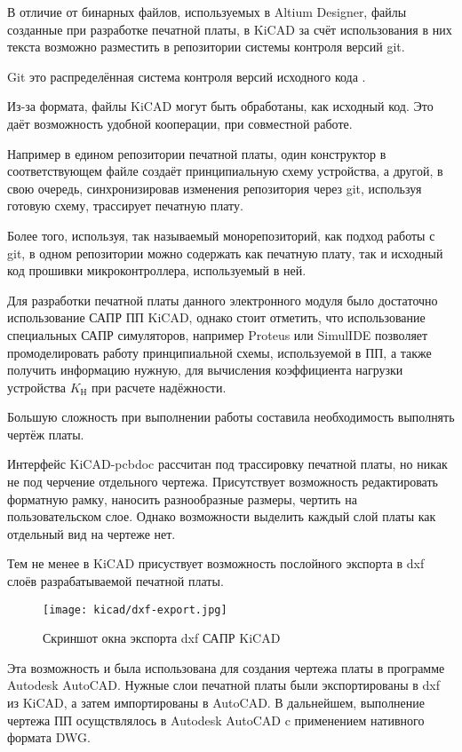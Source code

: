 В отличие от бинарных файлов, используемых в Altium Designer, файлы
созданные при разработке печатной платы, в KiCAD за счёт использования
в них текста возможно разместить в репозитории системы контроля версий
git.

Git это распределённая система контроля версий 
исходного кода \cite{git-dvcs}.

Из-за формата, файлы KiCAD могут быть обработаны, как исходный код.
Это даёт возможность удобной кооперации, при совместной работе.

Например в едином репозитории печатной платы, один конструктор в
соответствующем файле создаёт принципиальную схему устройства, а
другой, в свою очередь, синхронизировав изменения репозитория через
git, используя готовую схему, трассирует печатную плату.

Более того, используя, так называемый монорепозиторий, как подход
работы с git, в одном репозитории можно содержать как печатную плату,
так и исходный код прошивки микроконтроллера, используемый в ней.

Для разработки печатной платы данного электронного модуля было
достаточно использование САПР ПП KiCAD, однако стоит отметить, что
использование специальных САПР симуляторов, например Proteus или
SimulIDE позволяет промоделировать работу принципиальной схемы,
используемой в ПП, а также получить информацию нужную, для
вычисления коэффициента нагрузки устройства $K_{Н}$ при расчете
надёжности.


Большую сложность при выполнении работы составила необходимость
выполнять чертёж платы.

Интерфейс KiCAD-pcbdoc рассчитан под трассировку печатной платы, но
никак не под черчение отдельного чертежа.  Присутствует возможность
редактировать форматную рамку, наносить разнообразные размеры, чертить
на пользовательском слое.  Однако возможности выделить каждый слой
платы как отдельный вид на чертеже нет.

Тем не менее в KiCAD присуствует возможность послойного экспорта в dxf
слоёв разрабатываемой печатной платы.

\begin{figure}[H]
  \centering
  \texttt{[image: kicad/dxf-export.jpg]}
  \caption{Скриншот окна экспорта dxf САПР KiCAD}
\end{figure}

Эта возможность и была использована для создания чертежа платы в
программе Autodesk AutoCAD. Нужные слои печатной платы были
экспортированы в dxf из KiCAD, а затем импортированы в AutoCAD. В
дальнейшем, выполнение чертежа ПП осущствлялось в Autodesk AutoCAD c
применением нативного формата DWG.

